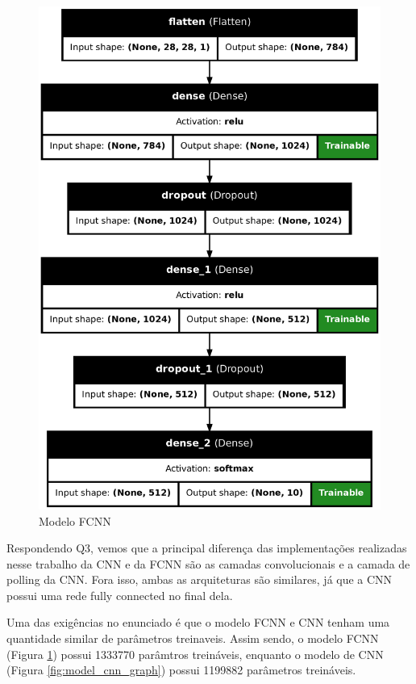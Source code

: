 \documentclass[12pt]{article}
\begin{document}
\begin{figure}[H]
\begin{minipage}{0.4\textwidth}
    \includegraphics[width=\textwidth]{../images/models/model_fcnn_graph.png}
    \caption{Modelo FCNN}
    \label{fig:model_fcnn_graph}
  \end{minipage}
\end{figure}

Respondendo Q3, vemos que a principal diferença das implementações realizadas nesse trabalho da CNN e da FCNN são as camadas convolucionais e a camada de polling da CNN. Fora isso, ambas as arquiteturas são similares, já que a CNN possui uma rede fully connected no final dela.

Uma das exigências no enunciado é que o modelo FCNN e CNN tenham uma quantidade similar de parâmetros treinaveis. Assim sendo, o modelo FCNN (Figura \ref{fig:model_fcnn_graph}) possui 1333770 parâmtros treináveis, enquanto o modelo de CNN (Figura \ref{fig:model_cnn_graph}) possui 1199882 parâmetros treináveis.
\end{document}
